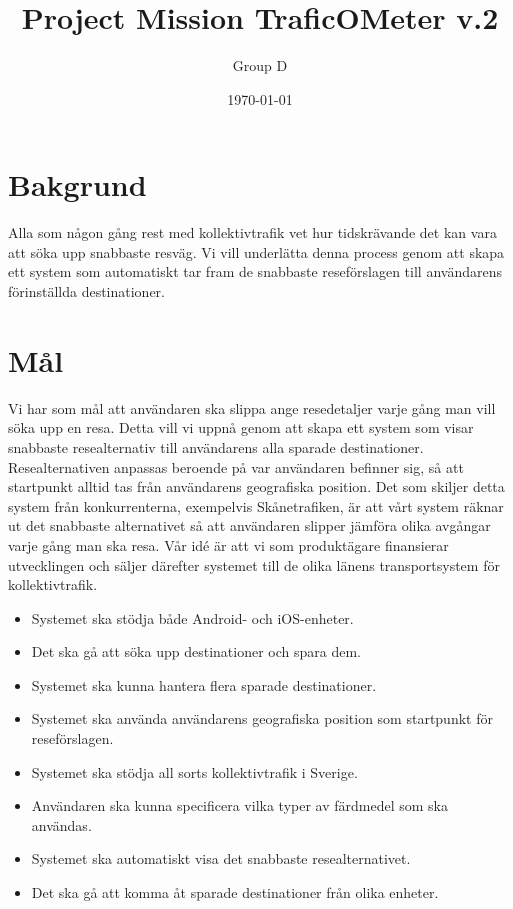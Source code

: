 \documentclass[a4paper]{article}
\title{Project Mission TraficOMeter v.2}
\author{Group D}
\date{\today}
\begin{document}
	\maketitle
	\thispagestyle{empty}
	\setcounter{page}{0}
	\pagebreak
	\tableofcontents
	\pagebreak

	\section{Bakgrund} %
	\label{sec:background}
		Alla som någon gång rest med kollektivtrafik vet hur tidskrävande det kan vara att söka upp
snabbaste resväg. Vi vill underlätta denna process genom att skapa ett system som automatiskt
tar fram de snabbaste reseförslagen till användarens förinställda destinationer.
	

	\section{Mål} %
	\label{sec:m_l}
		Vi har som mål att användaren ska slippa ange resedetaljer varje gång man vill söka upp en resa. Detta vill vi uppnå genom att skapa ett system som visar snabbaste resealternativ till användarens alla sparade destinationer. Resealternativen anpassas beroende på var användaren befinner sig, så att startpunkt alltid tas från användarens geografiska position. Det som skiljer detta system från konkurrenterna, exempelvis Skånetrafiken, är att vårt system räknar ut det snabbaste alternativet så att användaren slipper jämföra olika avgångar varje gång man ska resa. Vår idé är att vi som produktägare finansierar utvecklingen och säljer därefter systemet till de olika länens transportsystem för kollektivtrafik.

		\begin{itemize}
			\item Systemet ska stödja både Android- och iOS-enheter.
			\item Det ska gå att söka upp destinationer och spara dem.
			\item Systemet ska kunna hantera flera sparade destinationer.
			\item Systemet ska använda användarens geografiska position som startpunkt för reseförslagen.
			\item Systemet ska stödja all sorts kollektivtrafik i Sverige.
			\item Användaren ska kunna specificera vilka typer av färdmedel som ska användas.
			\item Systemet ska automatiskt visa det snabbaste resealternativet.
			\item Det ska gå att komma åt sparade destinationer från olika enheter.
		\end{itemize}
\end{document}
